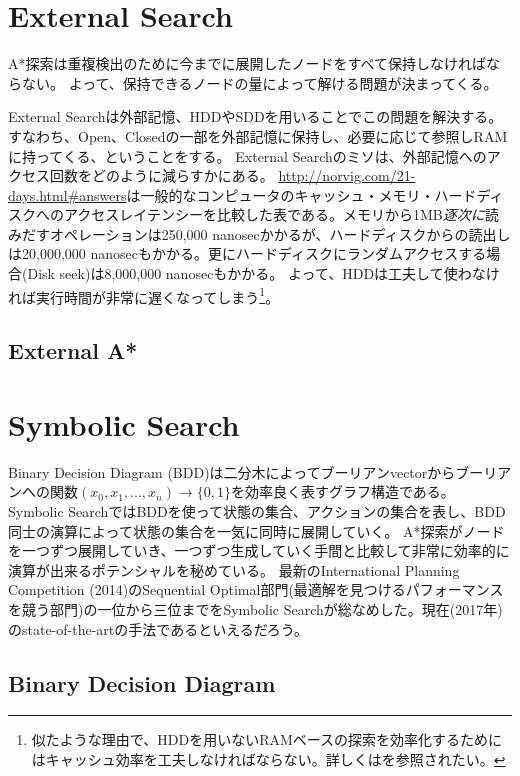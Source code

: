 \documentclass{report}
\begin{document}
\section{External Search}

A*探索は重複検出のために今までに展開したノードをすべて保持しなければならない。
よって、保持できるノードの量によって解ける問題が決まってくる。

External Searchは外部記憶、HDDやSDDを用いることでこの問題を解決する。
すなわち、Open、Closedの一部を外部記憶に保持し、必要に応じて参照しRAMに持ってくる、ということをする。
External Searchのミソは、外部記憶へのアクセス回数をどのように減らすかにある。
\url{http://norvig.com/21-days.html#answers}は一般的なコンピュータのキャッシュ・メモリ・ハードディスクへのアクセスレイテンシーを比較した表である。メモリから1MB{\it 逐次に}読みだすオペレーションは250,000 nanosecかかるが、ハードディスクからの読出しは20,000,000 nanosecもかかる。更にハードディスクにランダムアクセスする場合(Disk seek)は8,000,000 nanosecもかかる。
よって、HDDは工夫して使わなければ実行時間が非常に遅くなってしまう\footnote{似たような理由で、HDDを用いないRAMベースの探索を効率化するためにはキャッシュ効率を工夫しなければならない。詳しくは\cite{burns2012implementing}を参照されたい。}。

\subsection{External A*}


\section{Symbolic Search}

Binary Decision Diagram (BDD)は二分木によってブーリアンvectorからブーリアンへの関数$(x_0,x_1,...,x_n) \rightarrow \{0, 1\}$を効率良く表すグラフ構造である。
Symbolic SearchではBDDを使って状態の集合、アクションの集合を表し、BDD同士の演算によって状態の集合を一気に同時に展開していく。
A*探索がノードを一つずつ展開していき、一つずつ生成していく手間と比較して非常に効率的に演算が出来るポテンシャルを秘めている。
最新のInternational Planning Competition (2014)のSequential Optimal部門(最適解を見つけるパフォーマンスを競う部門)の一位から三位までをSymbolic Searchが総なめした。現在(2017年)のstate-of-the-artの手法であるといえるだろう。

\subsection{Binary Decision Diagram}
\end{document}
